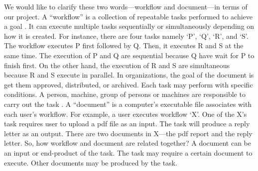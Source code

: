 We would like to clarify these two words---workflow and document---in terms of our project. %
A \enquote{workflow} is a collection of repeatable tasks performed to achieve a goal \cite{Jablonski:1996:WMM}.
It can execute multiple tasks sequentially or simultaneously depending on how it is created.
For instance, there are four tasks namely \enquote*{P}, \enquote*{Q}, \enquote*{R}, and \enquote*{S}.
The workflow executes P first followed by Q.
Then, it executes R and S at the same time.
The execution of P and Q are sequential because Q have wait for P to finish first.
On the other hand, the execution of R and S are simultaneous because R and S execute in parallel.
In organizations, the goal of the document is get them approved, distributed, or archived.
Each task may perform with specific conditions.
A person, machine, group of persons or machines are responsible to carry out the task \cite{wfMangement}. 
A \enquote{document} is a computer's executable file associates with each user's workflow.
For example, a user executes workflow \enquote*{X}.
One of the X's task requires user to upload a \gls{pdf} file as an input.
The task will produce a reply letter as an output.
There are two documents in X---the \gls{pdf} report and the reply letter.
So, how workflow and document are related together?
A document can be an input or end-product of the task.
The task may require a certain document to execute.
Other documents may be produced by the task.


